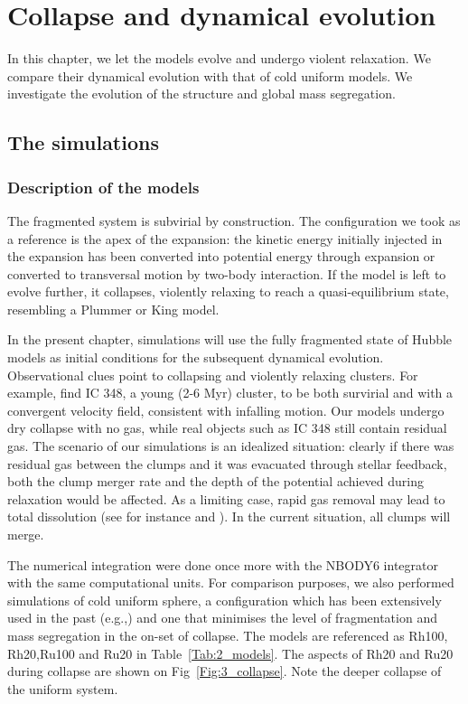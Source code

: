

\chapter{Collapse and dynamical evolution}


In this chapter, we let the \HubLem models evolve and undergo violent relaxation. We compare their dynamical evolution with that of cold uniform models. We investigate the evolution of the structure and global mass segregation.

\minitoc

\section{The simulations}
\label{Sec:3_simulations}

\subsection{Description of the models}

The \HubLem fragmented system is subvirial by construction. The configuration we took as a reference is the apex of the expansion: the kinetic energy initially injected in the expansion has been converted into potential energy through expansion or converted to transversal motion by two-body interaction. If the model is left to evolve further, it collapses, violently relaxing to reach a quasi-equilibrium state, resembling a Plummer or King model.

In the present chapter, simulations will use the fully fragmented state of Hubble models as initial conditions for the subsequent dynamical evolution. Observational clues point to  collapsing and violently relaxing clusters. For example, \cite{Cottaar2015} find IC 348, a young (2-6 Myr) cluster, to be both survirial and with a convergent velocity field, consistent with infalling motion. Our models undergo dry collapse with no gas, while real objects such as IC 348 still contain residual gas. The scenario of our simulations is an idealized situation: clearly if there was residual gas between the clumps and it was evacuated through stellar feedback, both the clump merger rate and the depth of the potential achieved during relaxation would be affected. As a limiting case, rapid gas removal may lead to total dissolution (see for instance \citealt{Moeckel2012} and \citealt{Fujii2016}). In the current situation, all clumps will merge. 


The numerical integration were done once more with the NBODY6 integrator with the same computational units. For comparison purposes, we also performed simulations of cold uniform sphere, a configuration which has been extensively used  in the past (e.g.,\citealt{Theis1999,Boily2002,Barnes2009,Caputo2014,Benhaiem2015}) and one that minimises the level of fragmentation and mass segregation in the on-set of collapse. The models are referenced as Rh100, Rh20,Ru100 and Ru20 in Table~\ref{Tab:2_models}. The aspects of Rh20 and Ru20 during collapse are shown on Fig~\ref{Fig:3_collapse}. Note the deeper collapse of the uniform system.

